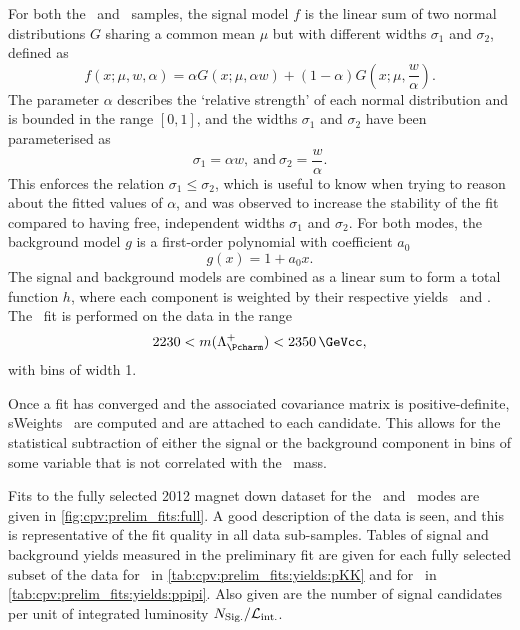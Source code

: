 For both the \pKK\ and \ppipi\ samples, the signal model $f$ is the linear sum
of two normal distributions $G$ sharing a common mean $\mu$ but with different
widths $\sigma_{1}$ and $\sigma_{2}$, defined as
\begin{equation}
  f(x; \mu, w, \alpha) = \alpha{}G(x; \mu, \alpha{w}) +
    (1 - \alpha)G(x; \mu, \frac{w}{\alpha}).
  \label{eqn:cpv:prelim_fits:sig_model}
\end{equation}
The parameter $\alpha$ describes the `relative strength' of each normal
distribution and is bounded in the range $[0, 1]$, and the widths $\sigma_{1}$
  and $\sigma_{2}$ have been parameterised as
\begin{equation}
  \sigma_{1} = \alpha{w},\ \text{and}\ \sigma_{2} = \frac{w}{\alpha}.
  \label{eqn:cpv:prelim_fits:sigma_def}
\end{equation}
This enforces the relation $\sigma_{1} \leq \sigma_{2}$, which is useful to
know when trying to reason about the fitted values of $\alpha$, and was
observed to increase the stability of the fit compared to having free,
independent widths $\sigma_{1}$ and $\sigma_{2}$.
For both modes, the background model $g$ is a first-order polynomial with
coefficient $a_{0}$
\begin{equation}
  g(x) = 1 + a_{0}x.
  \label{eqn:cpv:prelim_fits:bkg_model}
\end{equation}
The signal and background models are combined as a linear sum to form a total
function $h$, where each component is weighted by their respective yields
\nsig\ and \nbkg.
The \chisq\ fit is performed on the data in the range
\begin{equation}
  2230 < m(\PLambdac) < \SI{2350}{\GeVcc},
\end{equation}
with bins of width \SI{1}{\MeVcc}.

Once a fit has converged and the associated covariance matrix is
positive-definite, sWeights~\cite{Pivk:2004ty} are computed and are attached to
each candidate.
This allows for the statistical subtraction of either the signal or the
background component in bins of some variable that is not correlated with the
\PLambdac\ mass.

Fits to the fully selected 2012 magnet down dataset for the \pKK\ and \ppipi\
modes are given in \cref{fig:cpv:prelim_fits:full}.
A good description of the data is seen, and this is representative of the fit
quality in all data sub-samples.
Tables of signal and background yields measured in the preliminary fit are
given for each fully selected subset of the data for \pKK\ in
\cref{tab:cpv:prelim_fits:yields:pKK} and for \ppipi\ in
\cref{tab:cpv:prelim_fits:yields:ppipi}.
Also given are the number of signal candidates per unit of integrated
luminosity $N_{\text{Sig.}}/\mathcal{L}_{\textnormal{int.}}$.

